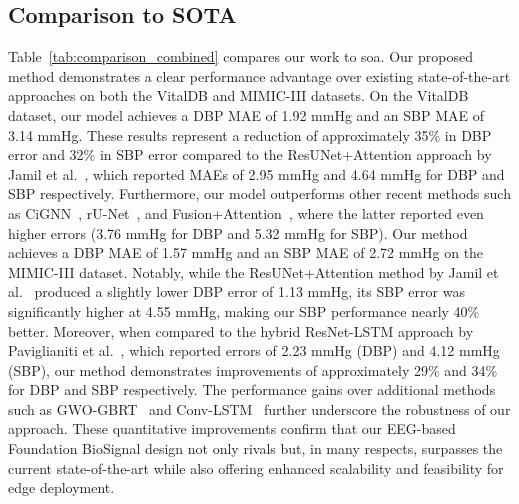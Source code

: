 \subsection{Comparison to SOTA}
Table~\ref{tab:comparison_combined} compares our work to \gls{soa}. Our proposed method demonstrates a clear performance advantage over existing state-of-the-art approaches on both the VitalDB and MIMIC-III datasets. On the VitalDB dataset, our model achieves a DBP MAE of 1.92 mmHg and an SBP MAE of 3.14 mmHg. These results represent a reduction of approximately 35\% in DBP error and 32\% in SBP error compared to the ResUNet+Attention approach by Jamil et al.~\cite{Jamil}, which reported MAEs of 2.95 mmHg and 4.64 mmHg for DBP and SBP respectively. Furthermore, our model outperforms other recent methods such as CiGNN~\cite{liu2024cignn}, rU-Net~\cite{runet}, and Fusion+Attention~\cite{el2021deep}, where the latter reported even higher errors (3.76 mmHg for DBP and 5.32 mmHg for SBP).
Our method achieves a DBP MAE of 1.57 mmHg and an SBP MAE of 2.72 mmHg on the MIMIC-III dataset. Notably, while the ResUNet+Attention method by Jamil et al.~\cite{Jamil} produced a slightly lower DBP error of 1.13 mmHg, its SBP error was significantly higher at 4.55 mmHg, making our SBP performance nearly 40\% better. Moreover, when compared to the hybrid ResNet-LSTM approach by Paviglianiti et al.~\cite{Paviglianiti2021ACO}, which reported errors of 2.23 mmHg (DBP) and 4.12 mmHg (SBP), our method demonstrates improvements of approximately 29\% and 34\% for DBP and SBP respectively. The performance gains over additional methods such as GWO-GBRT~\cite{liu2024continuous} and Conv-LSTM~\cite{kamanditya2024continuous} further underscore the robustness of our approach. These quantitative improvements confirm that our EEG-based Foundation BioSignal design not only rivals but, in many respects, surpasses the current state-of-the-art while also offering enhanced scalability and feasibility for edge deployment. 

